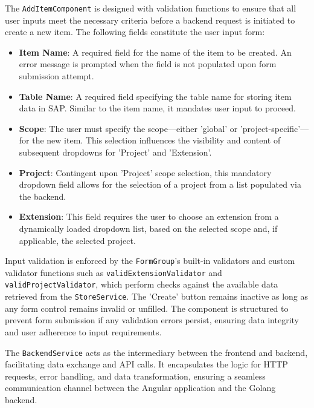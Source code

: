The \texttt{AddItemComponent} is designed with validation functions to ensure that all user inputs meet the necessary criteria before a backend request is initiated to create a new item.
The following fields constitute the user input form:

\begin{itemize}
    \item \textbf{Item Name}: A required field for the name of the item to be created.
    An error message is prompted when the field is not populated upon form submission attempt.
    \item \textbf{Table Name}: A required field specifying the table name for storing item data in SAP. Similar to the item name, it mandates user input to proceed.
    \item \textbf{Scope}: The user must specify the scope—either 'global' or 'project-specific'—for the new item.
    This selection influences the visibility and content of subsequent dropdowns for 'Project' and 'Extension'.
    \item \textbf{Project}: Contingent upon 'Project' scope selection, this mandatory dropdown field allows for the selection of a project from a list populated via the backend.
    \item \textbf{Extension}: This field requires the user to choose an extension from a dynamically loaded dropdown list, based on the selected scope and, if applicable, the selected project.
\end{itemize}

Input validation is enforced by the \texttt{FormGroup}'s built-in validators and custom validator functions such as \texttt{validExtensionValidator} and \\\texttt{validProjectValidator}, which perform checks against the available data retrieved from the \texttt{StoreService}.
The 'Create' button remains inactive as long as any form control remains invalid or unfilled.
The component is structured to prevent form submission if any validation errors persist, ensuring data integrity and user adherence to input requirements.

The \texttt{BackendService} acts as the intermediary between the frontend and backend, facilitating data exchange and API calls.
It encapsulates the logic for HTTP requests, error handling, and data transformation, ensuring a seamless communication channel between the Angular application and the Golang backend.

